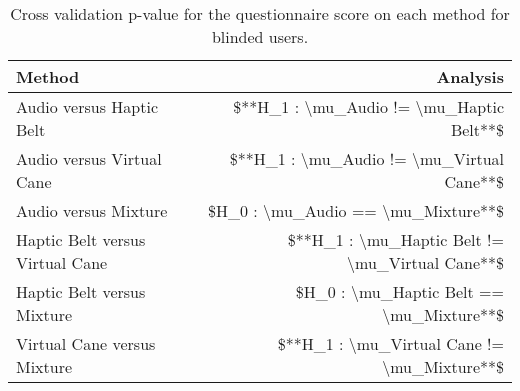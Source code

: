 
\begin{table}[!htb]
\centering
\caption{Cross validation p-value for the questionnaire score on each method for blinded users.}
\label{tab:lsd_questionnaire}
\begin{tabular}{lr}
\toprule
                         Method &                                        Analysis \\
\midrule
       Audio versus Haptic Belt &        \$**H\_1 : \textbackslash mu\_Audio != \textbackslash mu\_Haptic Belt**\$ \\
      Audio versus Virtual Cane &       \$**H\_1 : \textbackslash mu\_Audio != \textbackslash mu\_Virtual Cane**\$ \\
           Audio versus Mixture &              \$H\_0 : \textbackslash mu\_Audio == \textbackslash mu\_Mixture**\$ \\
Haptic Belt versus Virtual Cane & \$**H\_1 : \textbackslash mu\_Haptic Belt != \textbackslash mu\_Virtual Cane**\$ \\
     Haptic Belt versus Mixture &        \$H\_0 : \textbackslash mu\_Haptic Belt == \textbackslash mu\_Mixture**\$ \\
    Virtual Cane versus Mixture &     \$**H\_1 : \textbackslash mu\_Virtual Cane != \textbackslash mu\_Mixture**\$ \\
\bottomrule
\end{tabular}
\end{table}

